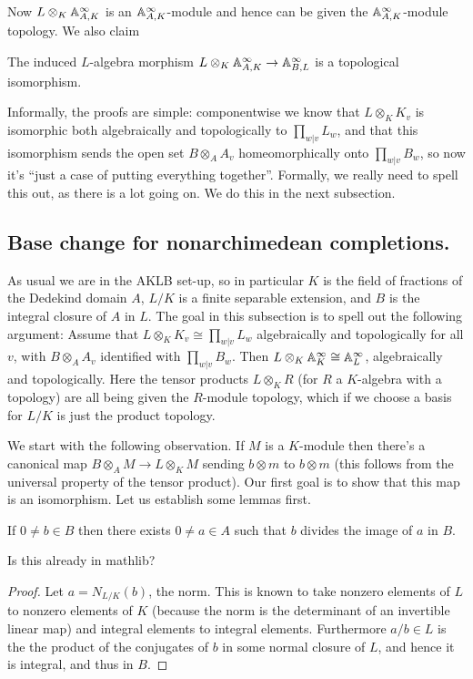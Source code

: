 Now $L\otimes_K\mathbb{A}_{A,K}^\infty$ is an $\mathbb{A}_{A,K}^\infty$-module and hence can be given
the $\mathbb{A}_{A,K}^\infty$-module topology. We also claim

\begin{theorem}
  \label{IsDedekindDomain.FiniteAdeleRing.baseChangeContinuousAlgEquiv}
  \leanok
The induced $L$-algebra morphism
  $L\otimes_K\mathbb{A}_{A,K}^\infty\to\mathbb{A}_{B,L}^\infty$ is a topological isomorphism.
\end{theorem}

Informally, the proofs are simple: componentwise we know
that $L\otimes_KK_v$ is isomorphic both algebraically and
topologically to $\prod_{w|v}L_w$, and that this isomorphism
sends the open set $B\otimes_AA_v$ homeomorphically onto
$\prod_{w|v}B_w$, so now it's ``just a case of putting everything
together''. Formally, we really need to spell this out, as there is a lot
going on. We do this in the
next subsection.

\subsection{Base change for nonarchimedean completions.}

As usual we are in the AKLB set-up, so in particular $K$ is the field
of fractions of the Dedekind domain $A$, $L/K$ is a finite
separable extension, and $B$ is the integral closure of $A$
in $L$. The goal in this subsection is to spell out the following argument: Assume that
$L\otimes_KK_v\cong\prod_{w|v}L_w$
algebraically and topologically for all $v$, with $B\otimes_AA_v$ identified with $\prod_{w|v}B_w$.
Then $L\otimes_K\mathbb{A}_K^\infty\cong\mathbb{A}_L^\infty$, algebraically and topologically. Here
the tensor products $L\otimes_K R$ (for $R$ a $K$-algebra with a topology) are all being
given the $R$-module topology, which if we choose a basis for $L/K$ is just the product
topology.

We start with the following observation. If $M$ is a $K$-module then there's a canonical
map $B\otimes_AM\to L\otimes_KM$ sending $b\otimes m$ to $b\otimes m$ (this follows from the
universal property of the tensor product). Our first goal
is to show that this map is an isomorphism. Let us establish some lemmas first.

\begin{lemma}
  \label{IsDedekindDomain.dvd_norm}
  If $0\not=b\in B$ then there exists $0\not=a\in A$ such that $b$ divides
  the image of $a$ in $B$.
\end{lemma}
\begin{remark} Is this already in mathlib?
\end{remark}
\begin{proof} Let $a=N_{L/K}(b)$, the norm. This is known to take nonzero elements of $L$
to nonzero elements of $K$ (because the norm is the determinant of an invertible linear map)
and integral elements to integral elements. Furthermore $a/b\in L$ is the the product of the
conjugates of $b$ in some normal closure of $L$, and hence it is integral, and thus in $B$.
\end{proof}

